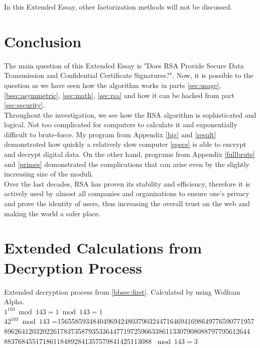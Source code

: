\documentclass[a4paper, 12pt]{article}
\begin{document}
In this Extended Essay, other factorization methods will not be discussed.

\newpage

\section{Conclusion}

The main question of this Extended Essay is "Does RSA Provide Secure Data Transmission and Confidential Certificate Signatures?". Now, it is possible to the question as we have seen how the algorithm works in parts \ref{sec:usage}, \ref{bsec:asymmetric}, \ref{sec:math}, \ref{sec:rsa} and how it can be hacked from part \ref{sec:security}.\\

Throughout the investigation, we see how the RSA algorithm is sophisticated and logical. Not too complicated for computers to calculate it and exponentially difficult to brute-force. My program from Appendix \ref{big} and \ref{result} demonstrated how quickly a relatively slow computer \ref{specs} is able to encrypt and decrypt digital data. On the other hand, programs from Appendix \ref{fullbrute} and \ref{primes} demonstrated the complications that can arise even by the slightly increasing size of the moduli.\\

Over the last decades, RSA has proven its stability and efficiency, therefore it is actively used by almost all companies and organizations to ensure one's privacy and prove the identity of users, thus increasing the overall trust on the web and making the world a safer place.\\

\newpage
\singlespace
\appendix
\section{Extended Calculations from Decryption Process}
\label{calc}
Extended decryption process from \ref{bbsec:first}. Calculated by using Wolfram Alpha.\cite{wa}\\

$1^{103} \bmod 143 =1 \bmod 143 = 1$\\

  $42 ^{103} \bmod 143$ =15655859348404969424803790324471646941698649776590771957
8962641203202261783735879353364477197259663386113307908088797795612644
883768455171861184892841357579841425113088 $\bmod 143 = 3$\\
\end{document}
